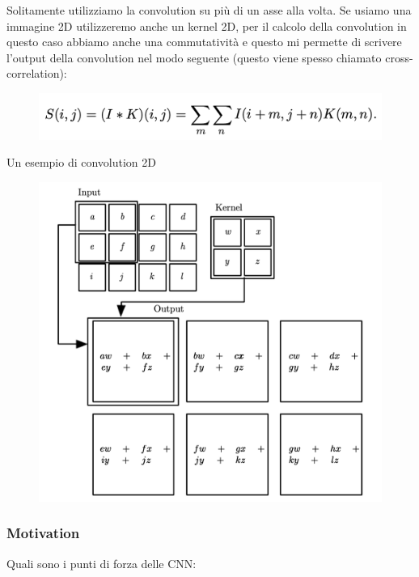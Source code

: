 \documentclass[14pt]{extreport}
\begin{document}
Solitamente utilizziamo la convolution su più di un asse alla volta. Se usiamo una immagine 2D utilizzeremo anche un kernel 2D, per il calcolo della
convolution in questo caso abbiamo anche una commutatività e questo mi permette di scrivere l'output della convolution nel modo seguente (questo viene
spesso chiamato cross-correlation):

\begin{figure}[H]
	\centering
	\includegraphics[width=0.7\linewidth]{410.jpeg}
\end{figure}

Un esempio di convolution 2D
\begin{figure}[H]
	\centering
	\includegraphics[width=0.7\linewidth]{409.jpeg}
\end{figure}

\subsubsection{Motivation}

Quali sono i punti di forza delle CNN:
\end{document}
